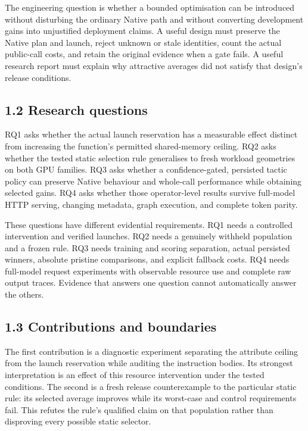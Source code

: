 \documentclass[11pt,a4paper]{article}
\begin{document}
The engineering question is whether a bounded optimisation can be introduced without disturbing the ordinary Native path and without converting development gains into unjustified deployment claims. A useful design must preserve the Native plan and launch, reject unknown or stale identities, count the actual public-call costs, and retain the original evidence when a gate fails. A useful research report must explain why attractive averages did not satisfy that design's release conditions.


\subsection*{1.2 Research questions}

RQ1 asks whether the actual launch reservation has a measurable effect distinct from increasing the function's permitted shared-memory ceiling. RQ2 asks whether the tested static selection rule generalises to fresh workload geometries on both GPU families. RQ3 asks whether a confidence-gated, persisted tactic policy can preserve Native behaviour and whole-call performance while obtaining selected gains. RQ4 asks whether those operator-level results survive full-model HTTP serving, changing metadata, graph execution, and complete token parity.


These questions have different evidential requirements. RQ1 needs a controlled intervention and verified launches. RQ2 needs a genuinely withheld population and a frozen rule. RQ3 needs training and scoring separation, actual persisted winners, absolute pristine comparisons, and explicit fallback costs. RQ4 needs full-model request experiments with observable resource use and complete raw output traces. Evidence that answers one question cannot automatically answer the others.


\subsection*{1.3 Contributions and boundaries}

The first contribution is a diagnostic experiment separating the attribute ceiling from the launch reservation while auditing the instruction bodies. Its strongest interpretation is an effect of this resource intervention under the tested conditions. The second is a fresh release counterexample to the particular static rule: its selected average improves while its worst-case and control requirements fail. This refutes the rule's qualified claim on that population rather than disproving every possible static selector.
\end{document}
